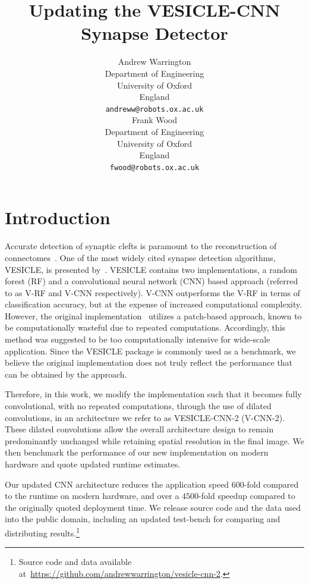 \documentclass{article}
\title{Updating the VESICLE-CNN Synapse Detector}
\author{
  Andrew Warrington \\
  Department of Engineering\\
  University of Oxford\\
  England \\
  \texttt{andreww@robots.ox.ac.uk} \\
  \And
  Frank Wood \\
  Department of Engineering\\
  University of Oxford\\
  England \\
  \texttt{fwood@robots.ox.ac.uk} \\ 
}%
\begin{document}
\maketitle



\section*{Introduction}
\label{sec:intro}

Accurate detection of synaptic clefts is paramount to the reconstruction of connectomes~\citep{seung2012connectome}.
One of the most widely cited synapse detection algorithms, VESICLE, is presented by~\citet{roncal2014vesicle}.
VESICLE contains two implementations, a random forest (RF) and a convolutional neural network (CNN) based approach (referred to as V-RF and V-CNN respectively).
V-CNN outperforms the V-RF in terms of classification accuracy, but at the expense of increased computational complexity.
However, the original implementation~\citep{vesiclegit} utilizes a patch-based approach, known to be computationally wasteful due to repeated computations.
Accordingly, this method was suggested to be too computationally intensive for wide-scale application.
Since the VESICLE package is commonly used as a benchmark, we believe the original implementation does not truly reflect the performance that can be obtained by the approach.

Therefore, in this work, we modify the implementation such that it becomes fully convolutional, with no repeated computations, through the use of dilated convolutions, in an architecture we refer to as VESICLE-CNN-2 (V-CNN-2).
These dilated convolutions allow the overall architecture design to remain predominantly unchanged while retaining spatial resolution in the final image.
We then benchmark the performance of our new implementation on modern hardware and quote updated runtime estimates.

Our updated CNN architecture reduces the application speed $600$-fold compared to the runtime on modern hardware, and over a $4500$-fold speedup compared to the originally quoted deployment time.
We release source code and the data used into the public domain, including an updated test-bench for comparing and distributing results.\footnote{Source code and data available at~\url{https://github.com/andrewwarrington/vesicle-cnn-2}.}
 
\end{document}
